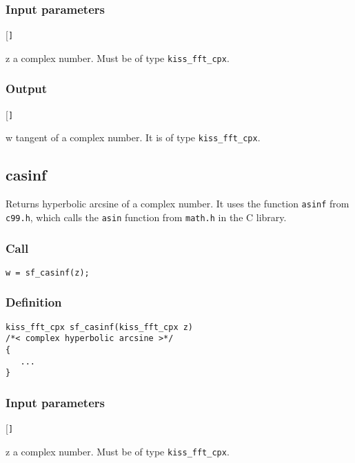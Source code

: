 \subsubsection*{Input parameters}
\begin{desclist}{\tt }{\quad}[\tt ]
   \setlength\itemsep{0pt}
   \item[z] a complex number. Must be of type \texttt{kiss\_fft\_cpx}.
\end{desclist}

\subsubsection*{Output}
\begin{desclist}{\tt }{\quad}[\tt ]
   \setlength\itemsep{0pt}
   \item[w] tangent of a complex number. It is of type \texttt{kiss\_fft\_cpx}.
\end{desclist}




\subsection{{casinf}}
Returns hyperbolic arcsine of a complex number. It uses the function \texttt{asinf} from \texttt{c99.h}, which calls the \texttt{asin} function from \texttt{math.h} in the C library.

\subsubsection*{Call}
\begin{verbatim}w = sf_casinf(z);\end{verbatim}

\subsubsection*{Definition}
\begin{verbatim}
kiss_fft_cpx sf_casinf(kiss_fft_cpx z)
/*< complex hyperbolic arcsine >*/
{
   ...  
}
\end{verbatim}

\subsubsection*{Input parameters}
\begin{desclist}{\tt }{\quad}[\tt ]
   \setlength\itemsep{0pt}
   \item[z] a complex number. Must be of type \texttt{kiss\_fft\_cpx}.
\end{desclist}

